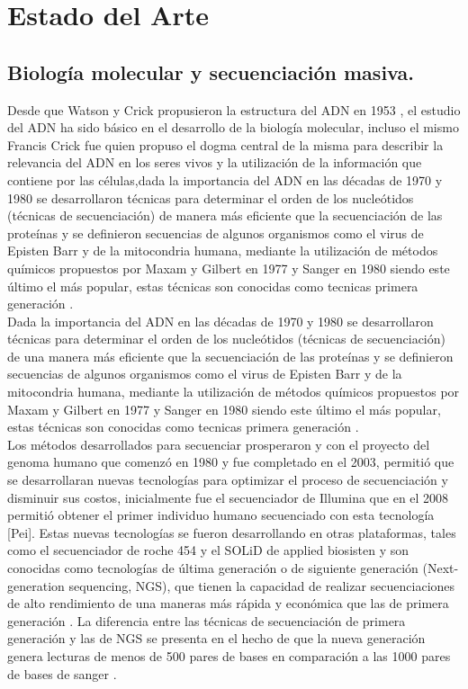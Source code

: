 \chapter{Estado del Arte}

\section{Biología molecular y secuenciación masiva.}

Desde  que  Watson y Crick propusieron la estructura del ADN en 1953 \cite{Watson1953}, el estudio del ADN ha sido básico en el desarrollo de la biología molecular, incluso el mismo Francis Crick fue quien propuso el dogma central de la misma para describir la relevancia del ADN en los seres vivos y la utilización de la información que contiene por las células,dada la importancia del  ADN  en las décadas de 1970 y 1980 se desarrollaron  técnicas para determinar el orden de los nucleótidos  (técnicas de secuenciación) de manera más eficiente que la secuenciación de las proteínas y se definieron secuencias de algunos organismos como el virus de Episten Barr y  de la mitocondria humana, mediante la utilización de métodos químicos propuestos por Maxam y Gilbert en 1977 y Sanger en 1980 siendo este último el más popular, estas técnicas son conocidas como tecnicas primera generación \cite{Herraez2012}. \\

Dada la importancia del  ADN  en las décadas de 1970 y 1980 se desarrollaron  técnicas para determinar el orden de los nucleótidos  (técnicas de secuenciación) de una manera más eficiente que la secuenciación de las proteínas y se definieron secuencias de algunos organismos como el virus de Episten Barr y  de la mitocondria humana, mediante la utilización de métodos químicos propuestos por Maxam y Gilbert en 1977 y Sanger en 1980 siendo este último el más popular, estas técnicas son conocidas como tecnicas primera generación \cite{Herraez2012}. \\

Los métodos desarrollados para secuenciar prosperaron y con el proyecto del genoma humano que comenzó en 1980 y fue completado en el 2003, permitió que se desarrollaran nuevas tecnologías para optimizar el proceso de secuenciación y disminuir sus costos, inicialmente fue el secuenciador de Illumina  que en el 2008 permitió obtener el primer individuo humano secuenciado con esta tecnología [Pei]. Estas nuevas tecnologías se fueron desarrollando en otras plataformas, tales como el secuenciador de roche 454 y el SOLiD de applied biosisten \cite{Pei} y son conocidas como tecnologías de última generación o de siguiente generación (Next-generation sequencing, NGS), que tienen la capacidad de realizar secuenciaciones de alto rendimiento de una maneras más rápida y económica que las de primera generación \cite{Herraez2012}. La diferencia entre las técnicas de secuenciación de primera generación y las de NGS se presenta en el hecho de que la nueva generación genera lecturas de menos de 500 pares de bases en comparación a las 1000 pares de bases de sanger \cite{Pei,Kulski2016}. \\

